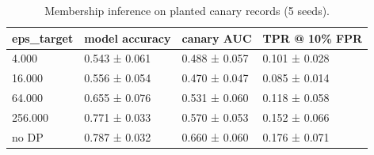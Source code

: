 \begin{table}
\caption{Membership inference on planted canary records (5 seeds).}
\label{tab:T03_membership_inference}
\begin{tabular}{llll}
\toprule
eps\_target & model accuracy & canary AUC & TPR @ 10\% FPR \\
\midrule
4.000 & 0.543 ± 0.061 & 0.488 ± 0.057 & 0.101 ± 0.028 \\
16.000 & 0.556 ± 0.054 & 0.470 ± 0.047 & 0.085 ± 0.014 \\
64.000 & 0.655 ± 0.076 & 0.531 ± 0.060 & 0.118 ± 0.058 \\
256.000 & 0.771 ± 0.033 & 0.570 ± 0.053 & 0.152 ± 0.066 \\
no DP & 0.787 ± 0.032 & 0.660 ± 0.060 & 0.176 ± 0.071 \\
\bottomrule
\end{tabular}
\end{table}
